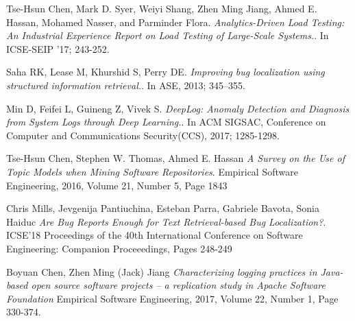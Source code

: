 \begin{thebibliography}{9}
Tse-Hsun Chen, Mark D. Syer, Weiyi Shang, Zhen Ming Jiang, Ahmed E. Hassan, Mohamed Nasser, and Parminder Flora.
\textit{Analytics-Driven Load Testing: An Industrial Experience Report on Load Testing of Large-Scale Systems.}. 
In ICSE-SEIP '17; 243-252.
 
Saha RK, Lease M, Khurshid S, Perry DE.
\textit{Improving bug localization using structured information retrieval.}.
 In ASE, 2013; 345–355.
 
Min D, Feifei L, Guineng Z, Vivek S. 
\textit{DeepLog: Anomaly Detection and Diagnosis from System Logs through Deep Learning.}.
In ACM SIGSAC, Conference on Computer and Communications Security(CCS), 2017; 1285-1298.

Tse-Hsun Chen, Stephen W. Thomas, Ahmed E. Hassan
\textit{A Survey on the Use of Topic Models when Mining Software Repositories}.
Empirical Software Engineering, 2016, Volume 21, Number 5, Page 1843

Chris Mills, Jevgenija Pantiuchina, Esteban Parra, Gabriele Bavota, Sonia Haiduc
\textit{Are Bug Reports Enough for Text Retrieval-based Bug Localization?}.
ICSE'18 Proceedings of the 40th International Conference on Software Engineering: Companion Proceeedings, Pages 248-249 

Boyuan Chen, Zhen Ming (Jack) Jiang
\textit{Characterizing logging practices in Java-based open source software projects – a replication study in Apache Software Foundation}
Empirical Software Engineering, 2017, Volume 22, Number 1, Page 330-374.

\end{thebibliography}